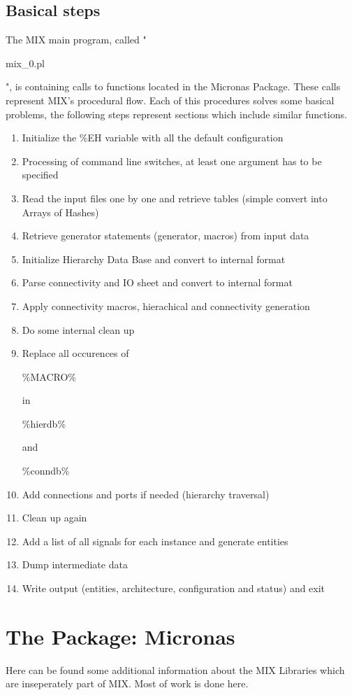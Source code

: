 \documentclass[a4paper,12pt]{article}
\begin{document}
\subsection{Basical steps}
The MIX main program, called "\begin{tt}mix\_0.pl\end{tt}", is containing calls to functions located in the Micronas Package. These calls represent MIX's procedural flow. Each of this procedures solves some basical problems, the following steps represent sections which include similar functions.
\begin{enumerate}
\item{Initialize the \%EH variable with all the default configuration}
\item{Processing of command line switches, at least one argument has to be specified}
\item{Read the input files one by one and retrieve tables (simple convert into Arrays of Hashes)}
\item{Retrieve generator statements (generator, macros) from input data}
\item{Initialize Hierarchy Data Base and convert to internal format}
\item{Parse connectivity and IO sheet and convert to internal format}
\item{Apply connectivity macros, hierachical and connectivity generation}
\item{Do some internal clean up}
\item{Replace all occurences of \begin{tt}\%MACRO\%\end{tt} in \begin{tt}\%hierdb\%\end{tt} and \begin{tt}\%conndb\%\end{tt}}
\item{Add connections and ports if needed (hierarchy traversal)}
\item{Clean up again}
\item{Add a list of all signals for each instance and generate entities}
\item{Dump intermediate data}
\item{Write output (entities, architecture, configuration and status) and exit}
\end{enumerate}

\section{The Package: Micronas}
Here can be found some additional information about the MIX Libraries which are inseperately part of MIX. Most of work is done here.
\end{document}
